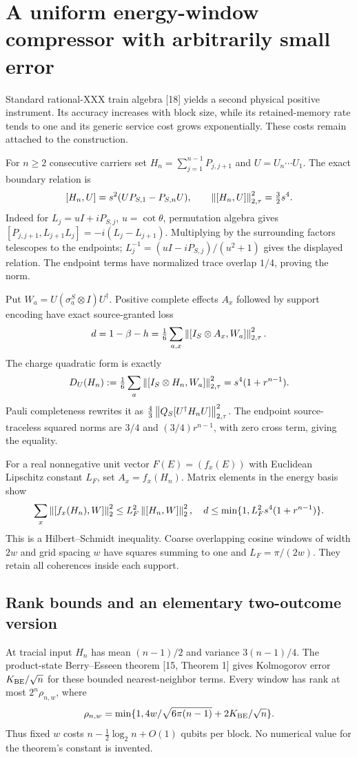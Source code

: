 \section{A uniform energy-window compressor with arbitrarily small error}
Standard rational-XXX train algebra [18] yields a second physical positive
instrument. Its accuracy increases with block size, while its retained-memory
rate tends to one and its generic service cost grows exponentially. These
costs remain attached to the construction.

For $n\ge2$ consecutive carriers set $H_n=\sum_{j=1}^{n-1}P_{j,j+1}$ and
$U=U_n\cdots U_1$. The exact boundary relation is
\[
 [H_n,U]=s^2(UP_{S,1}-P_{S,n}U),\qquad
 \left\lVert[H_n,U]\right\rVert_{2,\tau}^2=\tfrac32s^4.
\]
Indeed for $L_j=uI+iP_{S,j}$, $u=\cot\theta$, permutation algebra gives
$[P_{j,j+1},L_{j+1}L_j]=-i(L_j-L_{j+1})$.
Multiplying by the surrounding factors telescopes to the endpoints;
$L_j^{-1}=(uI-iP_{S,j})/(u^2+1)$ gives the displayed relation.
The endpoint terms have normalized trace overlap $1/4$, proving the norm.

Put $W_a=U(\sigma_a^S\otimes I)U^\dagger$. Positive complete effects
$A_x$ followed by support encoding have exact source-granted loss
\[
 d=1-\beta-h=\tfrac16\sum_{a,x}\left\lVert[I_S\otimes A_x,W_a]\right\rVert_{2,\tau}^2.
\]
The charge quadratic form is exactly
\[
 D_U(H_n):=\tfrac16\sum_a\left\lVert[I_S\otimes H_n,W_a]\right\rVert_{2,\tau}^2
 =s^4(1+r^{n-1}).
\]
Pauli completeness rewrites it as
$\tfrac43\left\lVert Q_S[U^\dagger H_nU]\right\rVert_{2,\tau}^2$.
The endpoint source-traceless squared norms are $3/4$ and
$(3/4)r^{n-1}$, with zero cross term, giving the equality.

For a real nonnegative unit vector $F(E)=(f_x(E))$ with Euclidean
Lipschitz constant $L_F$, set $A_x=f_x(H_n)$. Matrix elements in the energy
basis show
\[
 \sum_x\left\lVert[f_x(H_n),W]\right\rVert_2^2\le L_F^2\left\lVert[H_n,W]\right\rVert_2^2,
 \quad d\le\min\{1,L_F^2s^4(1+r^{n-1})\}.
\]
This is a Hilbert--Schmidt inequality. Coarse overlapping cosine windows
of width $2w$ and grid spacing $w$ have squares summing to one and
$L_F=\pi/(2w)$. They retain all coherences inside each support.

\subsection{Rank bounds and an elementary two-outcome version}
At tracial input $H_n$ has mean $(n-1)/2$ and variance $3(n-1)/4$.
The product-state Berry--Esseen theorem [15, Theorem 1] gives Kolmogorov
error $K_{\rm BE}/\sqrt n$ for these bounded nearest-neighbor terms.
Every window has rank at most $2^n\rho_{n,w}$, where
\[
 \rho_{n,w}=\min\{1,4w/\sqrt{6\pi(n-1)}+2K_{\rm BE}/\sqrt n\}.
\]
Thus fixed $w$ costs $n-\tfrac12\log_2n+O(1)$ qubits per block.
No numerical value for the theorem's constant is invented.

